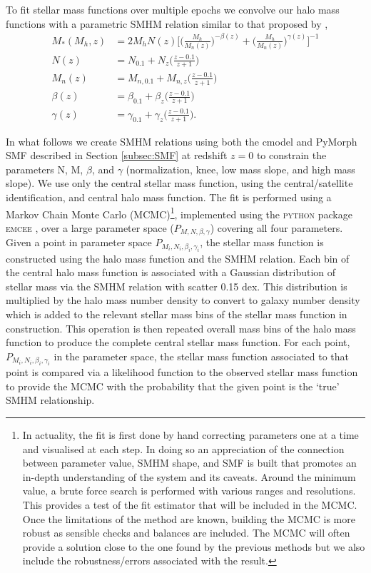 To fit stellar mass functions over multiple epochs we convolve our halo mass functions with a parametric SMHM relation similar to that proposed by \citet{Moster2010},
\begin{equation}
\label{eqn:MosAbn}
\begin{split}
M_*(M_h, z) &= 2M_hN(z)\Big[ \Big( \frac{M_h}{M_{n}(z)}\Big) ^{- \beta(z)} + \Big( \frac{M_h}{M_{n}(z)}\Big)^{\gamma(z)} \Big ]^{-1}\\
N(z) &= N_{0.1} +N_z\Big(\frac{z-0.1}{z+1}\Big)\\
M_{n}(z) &= M_{n,0.1} +M_{n,z}\Big(\frac{z-0.1}{z+1}\Big)\\
\beta(z) &= \beta_{0.1} +\beta_z\Big(\frac{z-0.1}{z+1}\Big)\\
\gamma(z) &= \gamma_{0.1} +\gamma_z\Big(\frac{z-0.1}{z+1}\Big).
\end{split}
\end{equation}

In what follows we create SMHM relations using both the cmodel and PyMorph SMF described in Section \ref{subsec:SMF} at redshift $z=0$ to constrain the parameters N, M, $\beta$, and $\gamma$ (normalization, knee, low mass slope, and high mass slope). We use only the central stellar mass function, using the \cite{Yang2012EvolutionHalos} central/satellite identification, and central halo mass function. The fit is performed using a Markov Chain Monte Carlo (MCMC)\footnote{In actuality, the fit is first done by hand correcting parameters one at a time and visualised at each step. In doing so an appreciation of the connection between parameter value, SMHM shape, and SMF is built that promotes an in-depth understanding of the system and its caveats. Around the minimum value, a brute force search is performed with various ranges and resolutions. This provides a test of the fit estimator that will be included in the MCMC. Once the limitations of the method are known, building the MCMC is more robust as sensible checks and balances are included. The MCMC will often provide a solution close to the one found by the previous methods but we also include the robustness/errors associated with the result.}, implemented using the \textsc{python} package \textsc{emcee} \citep{Foreman-Mackey2013EmceeHammer}, over a large parameter space ($P_{M, N, \beta, \gamma}$) covering all four parameters. Given a point in parameter space $P_{M_i, N_i, \beta_i, \gamma_i}$, the stellar mass function is constructed using the halo mass function and the SMHM relation. Each bin of the central halo mass function is associated with a Gaussian distribution of stellar mass via the SMHM relation with scatter 0.15 dex. This distribution is multiplied by the halo mass number density to convert to galaxy number density which is added to the relevant stellar mass bins of the stellar mass function in construction. This operation is then repeated overall mass bins of the halo mass function to produce the complete central stellar mass function. For each point, $P_{M_i, N_i, \beta_i, \gamma_i}$ in the parameter space, the stellar mass function associated to that point is compared via a likelihood function to the observed stellar mass function to provide the MCMC with the probability that the given point is the `true' SMHM relationship. 

